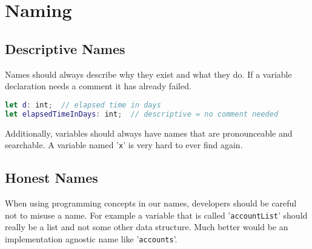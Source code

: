\section{Naming}

\subsection{Descriptive Names}
Names should always describe why they exist and what they do. If a variable declaration needs a comment it has already failed.

\begin{lstlisting}[language=Swift]
let d: int;  // elapsed time in days
let elapsedTimeInDays: int;  // descriptive = no comment needed
\end{lstlisting}
\raggedright

Additionally, variables should always have names that are pronounceable and searchable. A variable named '\texttt{x}' is very hard to ever find again.

\subsection{Honest Names}
When using programming concepts in our names, developers should be careful not to misuse a name. For example a variable that is called '\texttt{accountList}' should really be a list and not some other data structure. Much better would be an implementation agnostic name like '\texttt{accounts}'.
